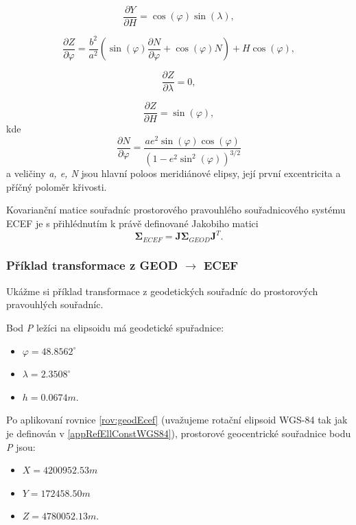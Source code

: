 \documentclass[11pt,a4paper]{article}
\begin{document}
\begin{equation}
\dfrac{\partial Y}{\partial H} = \cos{\left(\varphi \right)}\sin{\left(\lambda \right)},
\end{equation}

\begin{equation}
\dfrac{\partial Z}{\partial \varphi} = \dfrac{b^{2}}{a^{2}}\left(\sin{\left( \varphi\right)} \dfrac{\partial N}{\partial \varphi} + \cos{\left( \varphi \right)} N \right) + H\cos{\left( \varphi \right)},
\end{equation}

\begin{equation}
\dfrac{\partial Z}{\partial \lambda} = 0,
\end{equation}

\begin{equation}
\dfrac{\partial Z}{\partial H} = \sin{\left( \varphi \right)},
\end{equation}
kde
\begin{equation}
\dfrac{\partial N}{\partial \varphi} = \dfrac{a e^{2} \sin{\left(\varphi\right)}\cos{\left(\varphi\right)}}{\left(1-e^{2}\sin^{2}{\left(\varphi\right)}\right)^{3/2}}
\end{equation}
a veličiny \textit{a, e, N} jsou hlavní poloos meridiánové elipsy, její první excentricita a příčný poloměr křivosti.

Kovarianční matice souřadníc prostorového pravouhlého souřadnicového systému ECEF je s přihlédnutím k právě definované Jakobiho matici
\begin{equation}
\mathbf{\Sigma}_{ECEF} = \mathbf{J}\mathbf{\Sigma}_{GEOD}\mathbf{J}^{T}.
\end{equation}

\subsubsection{Příklad transformace z GEOD $\rightarrow$ ECEF}

Ukážme si příklad transformace z geodetických souřadníc do prostorových pravouhlých souřadníc.

Bod \textit{P} ležíci na elipsoidu má geodetické spuřadnice:
\begin{itemize}
\item $\varphi = 48.8562^{\circ}$
\item $\lambda = 2.3508^{\circ}$
\item $h = 0.0674 m.$
\end{itemize}
Po aplikovaní rovnice \ref{rov:geodEcef} (uvažujeme rotační elipsoid WGS-84 tak jak je definován v \ref{appRefEllConstWGS84}), prostorové geocentrické souřadnice bodu \textit{P} jsou:
\begin{itemize}
\item $X = 4200952.53 m$
\item $Y = 172458.50 m$
\item $Z = 4780052.13 m.$
\end{itemize}
\end{document}
